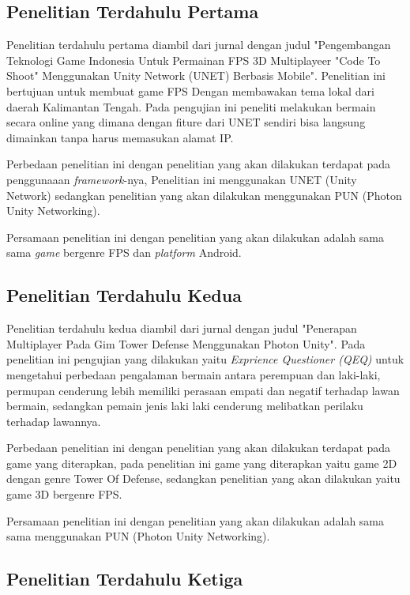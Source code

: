 \doublespacing
\begin{sloppypar}
\subsection{Penelitian Terdahulu Pertama}
\noindent

Penelitian terdahulu pertama diambil dari jurnal dengan judul "Pengembangan Teknologi Game Indonesia Untuk Permainan FPS 3D Multiplayeer "Code To Shoot" Menggunakan Unity Network (UNET) Berbasis Mobile". Penelitian ini bertujuan untuk membuat game FPS Dengan membawakan tema lokal dari daerah Kalimantan Tengah. Pada pengujian ini peneliti melakukan bermain secara online yang dimana dengan fiture dari UNET sendiri bisa langsung dimainkan tanpa harus memasukan alamat IP.

Perbedaan penelitian ini dengan penelitian yang akan dilakukan terdapat pada penggunaaan \textit{framework}-nya, Penelitian ini menggunakan UNET (Unity Network) sedangkan penelitian yang akan dilakukan menggunakan PUN (Photon Unity Networking).

Persamaan penelitian ini dengan penelitian yang akan dilakukan adalah sama sama \textit{game} bergenre FPS dan \textit{platform} Android.

\subsection{Penelitian Terdahulu Kedua}
\noindent

Penelitian terdahulu kedua diambil dari jurnal dengan judul  "Penerapan Multiplayer Pada Gim Tower Defense Menggunakan Photon Unity". Pada penelitian ini pengujian yang dilakukan yaitu \textit{Exprience Questioner (QEQ)} untuk mengetahui perbedaan pengalaman bermain antara perempuan dan laki-laki, permupan cenderung lebih memiliki perasaan empati dan negatif terhadap lawan bermain, sedangkan pemain jenis laki laki cenderung melibatkan perilaku terhadap lawannya.

Perbedaan penelitian ini dengan penelitian yang akan dilakukan terdapat pada game yang diterapkan, pada penelitian ini game yang diterapkan yaitu game 2D dengan genre Tower Of Defense, sedangkan penelitian yang akan dilakukan yaitu game 3D bergenre FPS.

Persamaan penelitian ini dengan penelitian yang akan dilakukan adalah sama sama menggunakan PUN (Photon Unity Networking).

\subsection{Penelitian Terdahulu Ketiga}
\noindent


\end{sloppypar}
